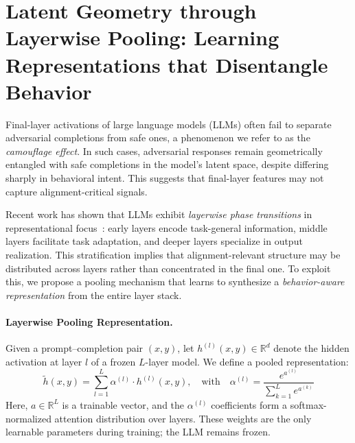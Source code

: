 \section{Latent Geometry through Layerwise Pooling: Learning Representations that Disentangle Behavior}
\label{sec:appendix_pool_profile}

Final-layer activations of large language models (LLMs) often fail to separate adversarial completions from safe ones, a phenomenon we refer to as the \textit{camouflage effect}. In such cases, adversarial responses remain geometrically entangled with safe completions in the model’s latent space, despite differing sharply in behavioral intent. This suggests that final-layer features may not capture alignment-critical signals.

Recent work has shown that LLMs exhibit \textit{layerwise phase transitions} in representational focus~\cite{liu2023lost,belrose2023language}: early layers encode task-general information, middle layers facilitate task adaptation, and deeper layers specialize in output realization. This stratification implies that alignment-relevant structure may be distributed across layers rather than concentrated in the final one. To exploit this, we propose a pooling mechanism that learns to synthesize a \textit{behavior-aware representation} from the entire layer stack.

\vspace{1mm}
\paragraph{Layerwise Pooling Representation.} Given a prompt–completion pair \((x, y)\), let \(h^{(l)}(x, y) \in \mathbb{R}^d\) denote the hidden activation at layer \(l\) of a frozen \(L\)-layer model. We define a pooled representation:
\[
\tilde{h}(x, y) = \sum_{l=1}^{L} \alpha^{(l)} \cdot h^{(l)}(x, y), \quad \text{with} \quad \alpha^{(l)} = \frac{e^{a^{(l)}}}{\sum_{k=1}^{L} e^{a^{(k)}}}
\]
Here, \(a \in \mathbb{R}^L\) is a trainable vector, and the \(\alpha^{(l)}\) coefficients form a softmax-normalized attention distribution over layers. These weights are the only learnable parameters during training; the LLM remains frozen.

\vspace{1mm}
